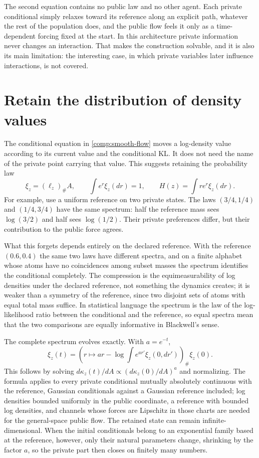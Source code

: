 The second equation contains no public law and no other agent. Each private conditional simply relaxes toward its reference along an explicit path, whatever the rest of the population does, and the public flow feels it only as a time-dependent forcing fixed at the start. In this architecture private information never changes an interaction. That makes the construction solvable, and it is also its main limitation: the interesting case, in which private variables later influence interactions, is not covered.

\section{Retain the distribution of density values}

The conditional equation in \cref{comp:smooth-flow} moves a log-density value according to its current value and the conditional KL. It does not need the name of the private point carrying that value. This suggests retaining the probability law
\begin{equation}
 \xi_z=(\ell_z)_\#A,\qquad
 \int e^r\xi_z(dr)=1,\qquad
 H(z)=\int re^r\xi_z(dr).
 \label{comp:spectrum}
\end{equation}
For example, use a uniform reference on two private states. The laws $(3/4,1/4)$ and $(1/4,3/4)$ have the same spectrum: half the reference mass sees $\log(3/2)$ and half sees $\log(1/2)$. Their private preferences differ, but their contribution to the public force agrees.

What this forgets depends entirely on the declared reference. With the reference $(0.6,0.4)$ the same two laws have different spectra, and on a finite alphabet whose atoms have no coincidences among subset masses the spectrum identifies the conditional completely. The compression is the equimeasurability of log densities under the declared reference, not something the dynamics creates; it is weaker than a symmetry of the reference, since two disjoint sets of atoms with equal total mass suffice. In statistical language the spectrum is the law of the log-likelihood ratio between the conditional and the reference, so equal spectra mean that the two comparisons are equally informative in Blackwell's sense.

The complete spectrum evolves exactly. With $a=e^{-t}$,
\begin{equation}
 \xi_z(t)=\left(r\mapsto ar-\log\int e^{ar'}\xi_z(0,dr')\right)_\#\xi_z(0).
 \label{comp:spectrum-evolution}
\end{equation}
This follows by solving $d\kappa_z(t)/dA\propto(d\kappa_z(0)/dA)^a$ and normalizing. The formula applies to every private conditional mutually absolutely continuous with the reference, Gaussian conditionals against a Gaussian reference included; log densities bounded uniformly in the public coordinate, a reference with bounded log densities, and channels whose forces are Lipschitz in those charts are needed for the general-space public flow. The retained state can remain infinite-dimensional. When the initial conditionals belong to an exponential family based at the reference, however, only their natural parameters change, shrinking by the factor $a$, so the private part then closes on finitely many numbers.

